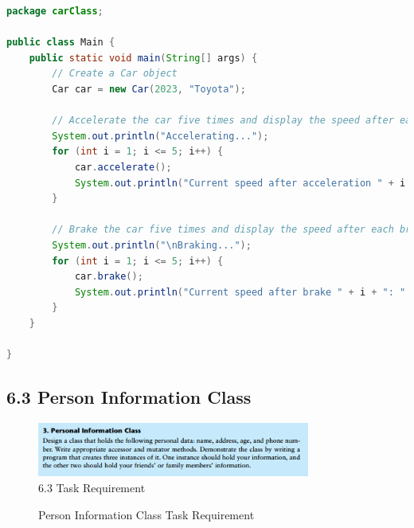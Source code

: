 \documentclass{article}
\begin{document}
\begin{lstlisting}[language=Java, caption=Main.java]
package carClass;

public class Main {
    public static void main(String[] args) {
        // Create a Car object
        Car car = new Car(2023, "Toyota");

        // Accelerate the car five times and display the speed after each acceleration
        System.out.println("Accelerating...");
        for (int i = 1; i <= 5; i++) {
            car.accelerate();
            System.out.println("Current speed after acceleration " + i + ": " + car.getSpeed() + " mph");
        }

        // Brake the car five times and display the speed after each brake
        System.out.println("\nBraking...");
        for (int i = 1; i <= 5; i++) {
            car.brake();
            System.out.println("Current speed after brake " + i + ": " + car.getSpeed() + " mph");
        }
    }

}

\end{lstlisting}

\subsection*{6.3 Person Information Class}
\begin{figure}[H]
    \centering
    \includegraphics[width=0.8\textwidth]{./Assets/Task requirements/Assignment6/6.3.png}
    
    \caption{6.3 Task Requirement}
\end{figure}

\begin{figure}[h]
    \centering
    \caption{Person Information Class Task Requirement}
\end{figure}
\end{document}
